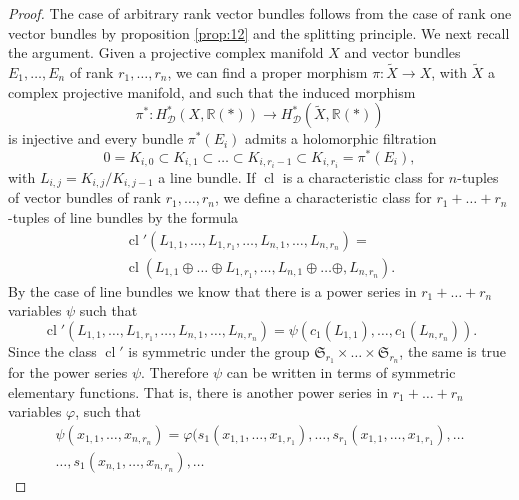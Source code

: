 \documentclass[10pt,twoside]{article}
\numberwithin{equation}{section}
\theoremstyle{plain}
\theoremstyle{definition}
\DeclareMathOperator{\cl}{cl}
\begin{document}
\begin{proof}
  The case  of arbitrary rank vector bundles follows from the case of rank
  one vector bundles by proposition \ref{prop:12} and the splitting
  principle. We next recall the argument. Given a projective complex
  manifold $X$ and vector bundles $E_{1},\dots ,E_{n}$ of rank
  $r_{1},\dots ,r_{n}$, we can find a proper morphism
  $\pi \colon\widetilde X\longrightarrow X$, with $\widetilde X$ a complex
  projective manifold, and such that the induced morphism
  \begin{displaymath}
    \pi
    ^{\ast}\colon H^{\ast}_{\mathcal{D}}(X,\mathbb{R}(\ast))\longrightarrow 
    H^{\ast}_{\mathcal{D}}(\widetilde X,\mathbb{R}(\ast))
  \end{displaymath}
  is injective and every bundle $\pi ^{\ast}(E_{i})$ admits a
  holomorphic filtration
  \begin{displaymath}
    0= K_{i,0}\subset K_{i,1}\subset \dots \subset
    K_{i,r_{i}-1}\subset K_{i,r_{i}}=\pi ^{\ast}(E_{i}),
  \end{displaymath}
  with $L_{i,j}=K_{i,j}/K_{i,j-1}$ a line bundle. If $\cl$ is a
  characteristic class for $n$-tuples of vector bundles of rank
  $r_{1},\dots ,r_{n}$, we define a characteristic class for
  $r_{1}+\dots +r_{n}$-tuples of line bundles by the formula
  \begin{multline*}
    \cl'(L_{1,1},\dots ,L_{1,r_{1}},\dots ,L_{n,1},\dots
    ,L_{n,r_{n}})=\\
    \cl(L_{1,1}\oplus \dots \oplus L_{1,r_{1}},\dots ,L_{n,1}\oplus
    \dots \oplus, L_{n,r_{n}}).
  \end{multline*}
  By the case of line bundles we know that there is a power series in
  $r_{1}+\dots +r_{n}$ variables $\psi$ such that
  \begin{displaymath}
    \cl'(L_{1,1},\dots ,L_{1,r_{1}},\dots ,L_{n,1},\dots
    ,L_{n,r_{n}})=\psi(c_{1}(L_{1,1}),\dots ,c_{1}(L_{n,r_{n}})).
  \end{displaymath}
  Since the class $\cl'$ is symmetric under the group
  $\mathfrak{S}_{r_{1}}\times \dots \times \mathfrak{S}_{r_{n}}$, the
  same is true for the power series $\psi$. Therefore $\psi$ can
  be written in terms of symmetric elementary functions. That is,
  there is another power series in $r_{1}+\dots +r_{n}$ variables
  $\varphi $, such that
  \begin{multline*}
    \psi(x_{1,1},\dots ,x_{n,r_{n}})=
    \varphi(s_{1}(x_{1,1},\dots ,x_{1,r_{1}}),\dots
    ,s_{r_{1}}(x_{1,1},\dots ,x_{1,r_{1}}),\dots\\
    \dots ,s_{1}(x_{n,1},\dots ,x_{n,r_{n}}),\dots

\end{multline*}
\end{proof}
\end{document}
